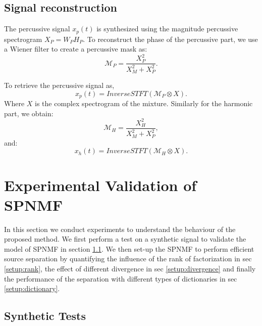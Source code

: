 \documentclass[journal]{IEEEtran}
\begin{document}
 
 
\subsection{Signal reconstruction}

The percussive signal $x_p(t)$ is synthesized using the magnitude percussive spectrogram $X_P = W_PH_P$. To reconstruct the phase of the percussive part, we use a Wiener filter to create a percussive mask as:
\begin{equation}
\mathcal{M}_P = \frac{X_P^2}{X_M^2 + X_P^2}.
\end{equation} 

To retrieve the percussive signal as, 
\begin{equation}
x_p(t) = InverseSTFT(\mathcal{M}_P \otimes X).
\end{equation}
Where $X$ is the complex spectrogram of the mixture.
Similarly for the harmonic part, we obtain:
\begin{equation}\label{percuweiner}
\mathcal{M}_H = \frac{X_H^2}{X_M^2 + X_P^2},
\end{equation}
and:
\begin{equation}
x_h(t) = InverseSTFT(\mathcal{M}_H \otimes X).
\end{equation}

\section{Experimental Validation of SPNMF}
\label{sec:experiments}

In this section we conduct experiments to understand the behaviour of the proposed method. We first perform a test on a synthetic signal to validate the model of SPNMF in section \ref{SynthTest}. We then set-up the SPNMF to perform efficient source separation by quantifying the influence of the rank of factorization in sec \ref{setup:rank}, the effect of different divergence in sec \ref{setup:divergence} and finally the performance of the separation with different types of dictionaries in sec \ref{setup:dictionary}.


\subsection{Synthetic Tests}\label{SynthTest}
\end{document}
